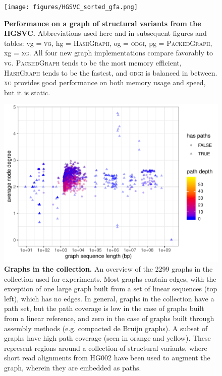 \documentclass{article}
\begin{document}
\begin{figure}
	\begin{center}
		\texttt{[image: figures/HGSVC\_sorted\_gfa.png]}
	\end{center}
	\caption{{\label{fig:hgsvc}
        \textbf{Performance on a graph of structural variants from the HGSVC.}
        Abbreviations used here and in subsequent figures and tables: vg = \textsc{vg}, hg = \textsc{HashGraph}, og = \textsc{odgi}, pg = \textsc{PackedGraph}, xg = \textsc{xg}.
        All four new graph implementations compare favorably to \textsc{vg}.
        \textsc{PackedGraph} tends to be the most memory efficient, \textsc{HashGraph} tends to be the fastest, and \textsc{odgi} is balanced in between.
        \textsc{xg} provides good performance on both memory usage and speed, but it is static.
        }
      }
\end{figure}

\begin{figure} %
  \centering
  \includegraphics[width=1.0\textwidth]{figures/graph_summary.pdf}
  \caption{
    \label{fig:graphprops}
    \textbf{Graphs in the collection.}
    An overview of the 2299 graphs in the collection used for experiments.
    Most graphs contain edges, with the exception of one large graph built from a set of linear sequences (top left), which has no edges.
    In general, graphs in the collection have a path set, but the path coverage is low in the case of graphs built from a linear reference, and zero in the case of graphs built through assembly methods (e.g. compacted de Bruijn graphs).
    A subset of graphs have high path coverage (seen in orange and yellow).
    These represent regions around a collection of structural variants, where short read alignments from HG002 have been used to augment the graph, wherein they are embedded as paths.
    }
\end{figure}
  
\end{document}
